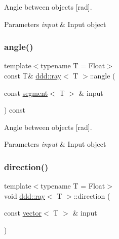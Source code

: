 Angle between objects \mbox{[}rad\mbox{]}. 


\begin{DoxyParams}{Parameters}
{\em input} & Input object \\
\hline
\end{DoxyParams}
\mbox{\label{classddd_1_1ray_ab634fe1fa02504d0b5de85555be324d5}} 
\subsubsection{\texorpdfstring{angle()}{angle()}\hspace{0.1cm}{\footnotesize\ttfamily [5/5]}}
{\footnotesize\ttfamily template$<$typename T = Float$>$ \\
const T\& \hyperlink{classddd_1_1ray}{ddd\+::ray}$<$ T $>$\+::angle (\begin{DoxyParamCaption}\item[{const \hyperlink{classddd_1_1segment}{segment}$<$ T $>$ \&}]{input }\end{DoxyParamCaption}) const\hspace{0.3cm}{\ttfamily [inline]}}



Angle between objects \mbox{[}rad\mbox{]}. 


\begin{DoxyParams}{Parameters}
{\em input} & Input object \\
\hline
\end{DoxyParams}
\mbox{\label{classddd_1_1ray_a52a945e00576b41d9e42a221a26aee14}} 
\subsubsection{\texorpdfstring{direction()}{direction()}}
{\footnotesize\ttfamily template$<$typename T = Float$>$ \\
void \hyperlink{classddd_1_1ray}{ddd\+::ray}$<$ T $>$\+::direction (\begin{DoxyParamCaption}\item[{const \hyperlink{classddd_1_1vector}{vector}$<$ T $>$ \&}]{input }\end{DoxyParamCaption})\hspace{0.3cm}{\ttfamily [inline]}}



